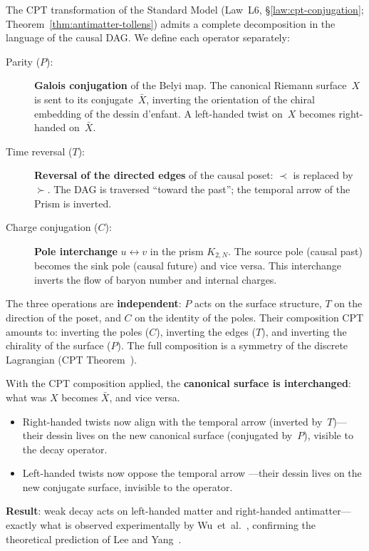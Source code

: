 The CPT transformation of the Standard Model (Law~L6,
\S\ref{law:cpt-conjugation}; Theorem~\ref{thm:antimatter-tollens})
admits a complete decomposition in the language of the causal DAG.
We define each operator separately:

\begin{description}
  \item[Parity ($P$):] \textbf{Galois conjugation} of the Belyi
    map. The canonical Riemann surface~$X$ is sent to its
    conjugate~$\bar{X}$, inverting the orientation of the
    chiral embedding of the dessin d'enfant. A left-handed twist
    on~$X$ becomes right-handed on~$\bar{X}$.
  \item[Time reversal ($T$):] \textbf{Reversal of the directed edges}
    of the causal poset: $\prec$ is replaced by~$\succ$.
    The DAG is traversed ``toward the past''; the temporal arrow of the
    Prism is inverted.
  \item[Charge conjugation ($C$):] \textbf{Pole interchange}
    $u \leftrightarrow v$ in the prism $K_{2,N}$. The source pole
    (causal past) becomes the sink pole (causal future) and
    vice versa. This interchange inverts the flow of baryon number
    and internal charges.
\end{description}

The three operations are \textbf{independent}: $P$ acts on the
surface structure, $T$ on the direction of the poset, and $C$
on the identity of the poles. Their composition CPT amounts to:
inverting the poles ($C$), inverting the edges ($T$), and inverting the
chirality of the surface ($P$). The full composition is a
symmetry of the discrete Lagrangian (CPT
Theorem~\cite{luders1954,pauli1955}).

\medskip
With the CPT composition applied, the \textbf{canonical
surface is interchanged}: what was $X$ becomes $\bar{X}$, and vice versa.
\begin{itemize}
  \item Right-handed twists now align with the temporal arrow
    (inverted by~$T$)---their dessin lives on the new
    canonical surface (conjugated by~$P$), visible to the
    decay operator.
  \item Left-handed twists now oppose the temporal arrow
    ---their dessin lives on the new conjugate surface, invisible
    to the operator.
\end{itemize}

\textbf{Result}: weak decay acts on left-handed matter
and right-handed antimatter---exactly what is observed
experimentally by Wu~et~al.~\cite{wu1957}, confirming the
theoretical prediction of Lee and
Yang~\cite{leeyang1956}.

